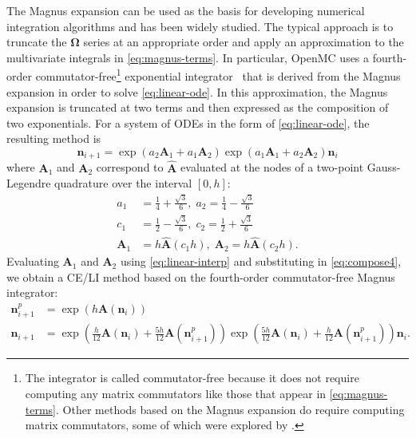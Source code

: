 \documentclass[3p,authoryear]{elsarticle}
\newcommand{\vect}[1]{\mathbf{#1}} %
\begin{document}
The Magnus expansion can be used as the basis for developing numerical
integration algorithms and has been widely studied. The typical approach is to
truncate the $\vect{\Omega}$ series at an appropriate order and apply an
approximation to the multivariate integrals in \cref{eq:magnus-terms}. In
particular, OpenMC uses a fourth-order commutator-free\footnote{The integrator
is called commutator-free because it does not require computing any matrix
commutators like those that appear in \cref{eq:magnus-terms}. Other methods
based on the Magnus expansion do require computing matrix commutators, some of
which were explored by \citet{josey2017phd}.} exponential
integrator~\citep{blanes2006anm} that is derived from the Magnus expansion in
order to solve \cref{eq:linear-ode}. In this approximation, the Magnus expansion
is truncated at two terms and then expressed as the composition of two
exponentials. For a system of ODEs in the form of \cref{eq:linear-ode}, the
resulting method is
\begin{equation}
  \label{eq:compose4}
  \vect{n}_{i+1} = \exp (a_2 \vect{A}_1 + a_1 \vect{A}_2)
  \exp (a_1 \vect{A}_1 + a_2 \vect{A}_2) \vect{n}_i
\end{equation}
where $\vect{A}_1$ and $\vect{A}_2$ correspond to $\hat{\vect{A}}$ evaluated at
the nodes of a two-point Gauss-Legendre quadrature over the interval $[0,h]$:
\begin{equation}
  \begin{split}
    a_1 &= \frac{1}{4} + \frac{\sqrt{3}}{6}, \; a_2 = \frac{1}{4} - \frac{\sqrt{3}}{6} \\
    c_1 &= \frac{1}{2} - \frac{\sqrt{3}}{6}, \; c_2 = \frac{1}{2} + \frac{\sqrt{3}}{6} \\
    \vect{A}_1 &= h\hat{\vect{A}}\left ( c_1 h\right ), \; \vect{A}_2 = h\hat{\vect{A}}\left ( c_2 h\right ).
  \end{split}
\end{equation}
Evaluating $\vect{A}_1$ and $\vect{A}_2$ using \cref{eq:linear-interp} and
substituting in \cref{eq:compose4}, we obtain a CE/LI method based on the
fourth-order commutator-free Magnus integrator:
\begin{equation}
  \label{eq:celi-cfq4}
  \begin{split}
  \vect{n}_{i+1}^p &= \exp \left ( h \vect{A}(\vect{n}_i ) \right ) \\
  \vect{n}_{i+1} &= \exp \left( \frac{h}{12} \vect{A}(\vect{n}_i) +
    \frac{5h}{12} \vect{A}(\vect{n}_{i+1}^p) \right)
  \exp \left( \frac{5h}{12} \vect{A}(\vect{n}_i) +
  \frac{h}{12} \vect{A}(\vect{n}_{i+1}^p) \right) \vect{n}_i.
  \end{split}
\end{equation}
\end{document}
